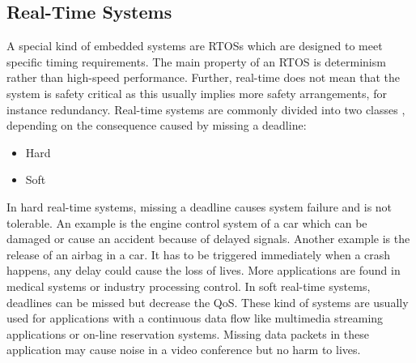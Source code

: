 \subsection{Real-Time Systems}
A special kind of embedded systems are \acp{RTOS} which are designed to meet specific timing requirements. 
The main property of an \ac{RTOS} is determinism rather than high-speed performance.  
Further, real-time does not mean that the system is safety critical as this usually implies more safety arrangements, for instance redundancy.
Real-time systems are commonly divided into two classes \cite{stromblad:elfrtoemd}, depending on the consequence caused by missing a deadline:
\begin{itemize}
	\item Hard
	\item Soft
\end{itemize}
In hard real-time systems, missing a deadline causes system failure and is not tolerable.  
An example is the engine control system of a car which can be damaged or cause an accident because of delayed signals.
Another example is the release of an airbag in a car. 
It has to be triggered immediately when a crash happens, any delay could cause the loss of lives. 
More applications are found in medical systems or industry processing control.  
In soft real-time systems, deadlines can be missed but decrease the \ac{QoS}. 
These kind of systems are usually used for applications with a continuous data flow like multimedia streaming applications or on-line reservation systems.
Missing data packets in these application may cause noise in a video conference but no harm to lives.

